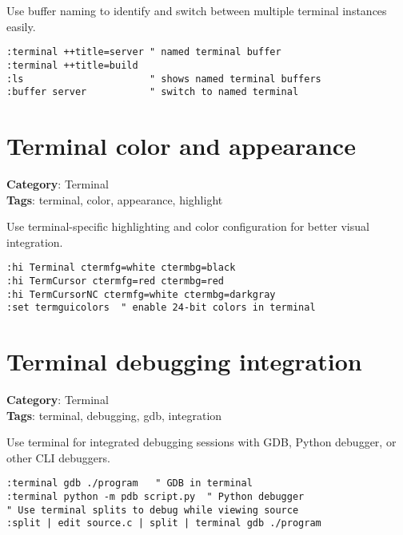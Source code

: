 {{{{{{{{{{Use buffer naming to identify and switch between multiple terminal instances easily.

\begin{Exa*}{}
\begin{Verbatim}[fontsize=\footnotesize, breaklines, breakanywhere]
:terminal ++title=server " named terminal buffer
:terminal ++title=build
:ls                      " shows named terminal buffers
:buffer server           " switch to named terminal
\end{Verbatim}
\end{Exa*}

\section{Terminal color and appearance}

\textbf{Category}: Terminal\\ \textbf{Tags}: terminal, color, appearance, highlight
\vspace{0.5cm}

Use terminal-specific highlighting and color configuration for better visual integration.

\begin{Exa*}{}
\begin{Verbatim}[fontsize=\footnotesize, breaklines, breakanywhere]
:hi Terminal ctermfg=white ctermbg=black
:hi TermCursor ctermfg=red ctermbg=red
:hi TermCursorNC ctermfg=white ctermbg=darkgray
:set termguicolors  " enable 24-bit colors in terminal
\end{Verbatim}
\end{Exa*}

\section{Terminal debugging integration}

\textbf{Category}: Terminal\\ \textbf{Tags}: terminal, debugging, gdb, integration
\vspace{0.5cm}

Use terminal for integrated debugging sessions with GDB, Python debugger, or other CLI debuggers.

\begin{Exa*}{}
\begin{Verbatim}[fontsize=\footnotesize, breaklines, breakanywhere]
:terminal gdb ./program   " GDB in terminal
:terminal python -m pdb script.py  " Python debugger
" Use terminal splits to debug while viewing source
:split | edit source.c | split | terminal gdb ./program
\end{Verbatim}
\end{Exa*}

}}}}}}}}}}

